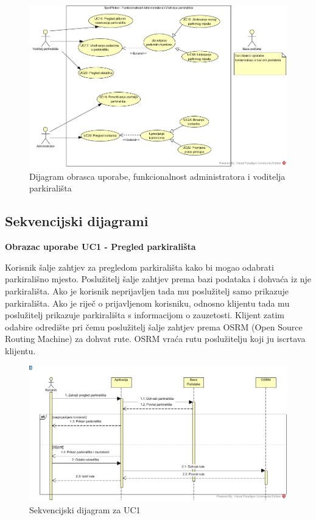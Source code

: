 \begin{figure}[H]
\centering
\includegraphics[width=\textwidth]{slike/UCD2.jpg} 
\caption{Dijagram obrasca uporabe, funkcionalnost administratora i voditelja parkirališta}
\label{fig:promjene7} 
\end{figure}
\eject		

\subsection{Sekvencijski dijagrami}

\textbf {Obrazac uporabe UC1 - Pregled parkirališta}

\vspace{1cm}

Korisnik šalje zahtjev za pregledom parkirališta kako bi mogao odabrati parkirališno mjesto. Poslužitelj šalje zahtjev prema bazi podataka i dohvaća iz nje parkirališta. Ako je korisnik neprijavljen tada mu poslužitelj samo prikazuje parkirališta. Ako je riječ o prijavljenom korisniku, odnosno klijentu tada mu poslužitelj prikazuje parkirališta s informacijom o zauzetosti. Klijent zatim odabire odredište pri čemu poslužitelj šalje zahtjev prema OSRM (Open Source Routing Machine) za dohvat rute. OSRM vraća rutu poslužitelju koji ju iscrtava klijentu.  

\vspace{1cm}

\begin{figure}[H]
\centering
\includegraphics[width=\textwidth]{slike/SD_UC1.JPG} 
\caption{Sekvencijski dijagram za UC1}
\label{fig:promjene8} 
\end{figure}

